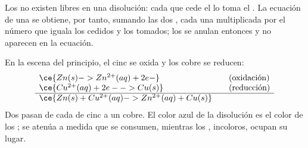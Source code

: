 \begin{proposition}\label{prop:g11:redox:no-free-electrons}
Los  no existen libres en una disolución: cada  que
cede el  lo toma el . La ecuación de una 
se obtiene, por tanto, sumando las dos , cada una
multiplicada por el número que iguala los  cedidos y los
 tomados; los  se anulan entonces y no aparecen en
la ecuación.
\end{proposition}

\begin{example}\label{ex:g11:redox:zinc-copper}
En la escena del principio, el cinc se oxida y los  cobre se
reducen:
\[
\begin{array}{l@{\qquad}l}
  \ce{Zn(s) -> Zn^{2+}(aq) + 2e-} & \text{(oxidación)}\\
  \ce{Cu^{2+}(aq) + 2e- -> Cu(s)} & \text{(reducción)}\\
  \hline
  \ce{Zn(s) + Cu^{2+}(aq) -> Zn^{2+}(aq) + Cu(s)} &
\end{array}
\]
Dos  pasan de cada  de cinc a un  cobre. El color azul
de la disolución es el color de los  ; se atenúa a
medida que se consumen, mientras los  , incoloros,
ocupan su lugar.
\end{example}

